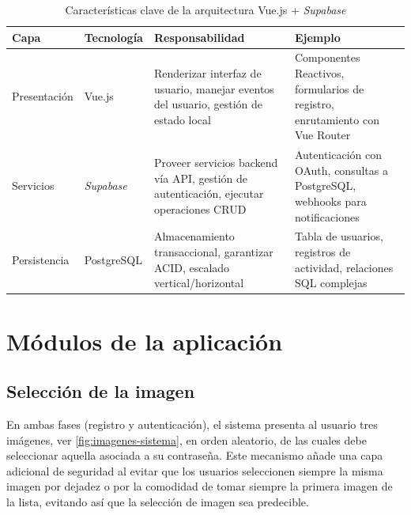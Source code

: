 \begin{table}[ht]
	\centering
	\caption{Características clave de la arquitectura Vue.js + \textit{Supabase} }
	\label{tab:arquitectura}
	\begin{tabular}{|p{2.1cm}|p{2cm}|p{5cm}|p{5cm}|} %
		\hline
		\rowcolor{gray!20} %
		\textbf{Capa} & \textbf{Tecnología} & \textbf{Responsabilidad} & \textbf{Ejemplo} \\
		\hline
		
		Presentación & Vue.js & 
		Renderizar interfaz de usuario, manejar eventos del usuario, gestión de estado local & 
		Componentes Reactivos, formularios de registro, enrutamiento con Vue Router \\
		\hline
		
		Servicios & \textit{Supabase}  & 
		Proveer servicios backend vía API, gestión de autenticación, ejecutar operaciones CRUD & 
		Autenticación con OAuth, consultas a PostgreSQL, webhooks para notificaciones \\
		\hline
		
		Persistencia & PostgreSQL & 
		Almacenamiento transaccional, garantizar ACID, escalado vertical/horizontal & 
		Tabla de usuarios, registros de actividad, relaciones SQL complejas \\
		\hline
	\end{tabular}
\end{table}


\section{M\'odulos de la aplicaci\'on}

\subsection{Selección de la imagen}
\label{subsec:seleccion-imagen}

En ambas fases (registro y autenticación), el sistema presenta al usuario tres imágenes, ver \ref{fig:imagenes-sistema}, en orden aleatorio, de las cuales debe seleccionar aquella asociada a su contraseña. Este mecanismo añade una capa adicional de seguridad al evitar que los usuarios seleccionen siempre la misma imagen por dejadez o por la comodidad de tomar siempre la primera imagen de la lista, evitando as\'i que la selecci\'on de imagen sea predecible. 


